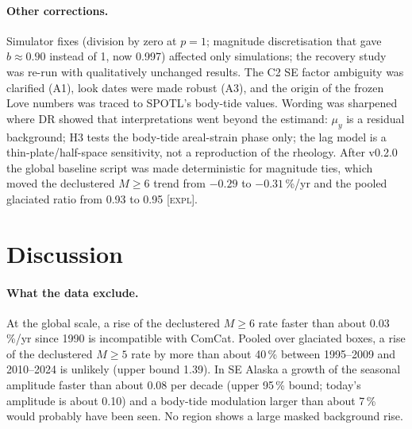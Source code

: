 \documentclass[11pt,a4paper]{article}
\newcommand{\expl}{\textnormal{\textsc{[expl]}}}
\newcommand{\muy}{\mu_y}
\begin{document}
\paragraph{Other corrections.} Simulator fixes (division by zero at $p=1$; magnitude discretisation that gave $b\approx0.90$ instead of 1, now 0.997) affected only simulations; the recovery study was re-run with qualitatively unchanged results. The C2 SE factor ambiguity was clarified (A1), look dates were made robust (A3), and the origin of the frozen Love numbers was traced to SPOTL's body-tide values. Wording was sharpened where DR showed that interpretations went beyond the estimand: $\muy$ is a residual background; H3 tests the body-tide areal-strain phase only; the lag model is a thin-plate/half-space sensitivity, not a reproduction of the \textcite{sasgen2026} rheology. After v0.2.0 the global baseline script was made deterministic for magnitude ties, which moved the declustered $M\geq6$ trend from $-0.29$ to $-0.31$\,\%/yr and the pooled glaciated ratio from 0.93 to 0.95 \expl.

\section{Discussion}
\label{sec:discussion}

\paragraph{What the data exclude.}
At the global scale, a rise of the declustered $M\geq6$ rate faster than about 0.03\,\%/yr since 1990 is incompatible with ComCat. Pooled over glaciated boxes, a rise of the declustered $M\geq5$ rate by more than about 40\,\% between 1995--2009 and 2010--2024 is unlikely (upper bound 1.39). In SE Alaska a growth of the seasonal amplitude faster than about 0.08 per decade (upper 95\,\% bound; today's amplitude is about 0.10) and a body-tide modulation larger than about 7\,\% would probably have been seen. No region shows a large masked background rise.
\end{document}
